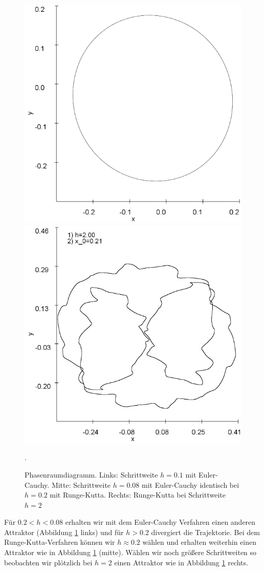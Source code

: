 \documentclass{scrartcl}
\begin{document}
\begin{figure}[!htbp]
\includegraphics[scale=0.28]{duffing-awp1-500k-nach-500k-h0,08-euler}
\includegraphics[scale=0.28]{duffing-awp1-h2-runge-kutta}
\caption{Phasenraumdiagramm. Links: Schrittweite $h=0.1$ mit Euler-Cauchy. Mitte: Schrittweite $h=0.08$ mit Euler-Cauchy identisch bei $h=0.2$ mit Runge-Kutta. Rechts: Runge-Kutta bei Schrittweite $h=2$}. 
\label{fig:duffing-awp1}
\end{figure}
Für $0.2<h<0.08$ erhalten wir mit dem Euler-Cauchy Verfahren einen anderen Attraktor (Abbildung \ref{fig:duffing-awp1} links) und für $h>0.2$ divergiert die Trajektorie. Bei dem Runge-Kutta-Verfahren können wir $h \approx 0.2$ wählen und erhalten weiterhin einen Attraktor wie in Abbildung \ref{fig:duffing-awp1} (mitte). Wählen wir noch größere Schrittweiten so beobachten wir plötzlich bei $h=2$ einen Attraktor wie in Abbildung \ref{fig:duffing-awp1} rechts.
\end{document}
